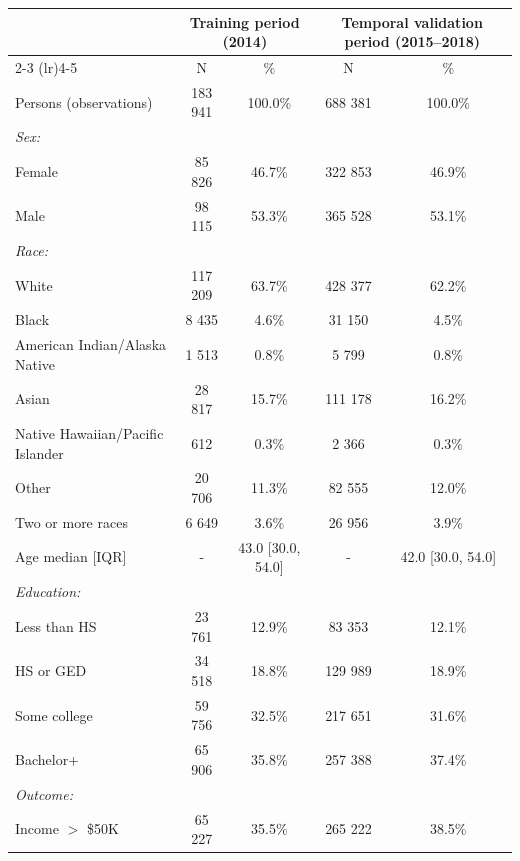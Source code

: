 \begin{tabular}{lcccc}
\toprule
 & \multicolumn{2}{c}{Training period (2014)} & \multicolumn{2}{c}{Temporal validation period (2015--2018)} \\
\cmidrule(lr){2-3} \cmidrule(lr){4-5}
 & N & \% & N & \% \\
\midrule
Persons (observations) & 183 941 & 100.0\% & 688 381 & 100.0\% \\
\addlinespace
\textit{Sex:} &  &  &  &  \\
Female & 85 826 & 46.7\% & 322 853 & 46.9\% \\
Male & 98 115 & 53.3\% & 365 528 & 53.1\% \\
\addlinespace
\textit{Race:} &  &  &  &  \\
White & 117 209 & 63.7\% & 428 377 & 62.2\% \\
Black & 8 435 & 4.6\% & 31 150 & 4.5\% \\
American Indian/Alaska Native & 1 513 & 0.8\% & 5 799 & 0.8\% \\
Asian & 28 817 & 15.7\% & 111 178 & 16.2\% \\
Native Hawaiian/Pacific Islander & 612 & 0.3\% & 2 366 & 0.3\% \\
Other & 20 706 & 11.3\% & 82 555 & 12.0\% \\
Two or more races & 6 649 & 3.6\% & 26 956 & 3.9\% \\
Age median [IQR] & - & 43.0 [30.0, 54.0] & - & 42.0 [30.0, 54.0] \\
\addlinespace
\textit{Education:} &  &  &  &  \\
Less than HS & 23 761 & 12.9\% & 83 353 & 12.1\% \\
HS or GED & 34 518 & 18.8\% & 129 989 & 18.9\% \\
Some college & 59 756 & 32.5\% & 217 651 & 31.6\% \\
Bachelor+ & 65 906 & 35.8\% & 257 388 & 37.4\% \\
\addlinespace
\textit{Outcome:} &  &  &  &  \\
Income $>$ \$50K & 65 227 & 35.5\% & 265 222 & 38.5\% \\
\bottomrule
\end{tabular}
